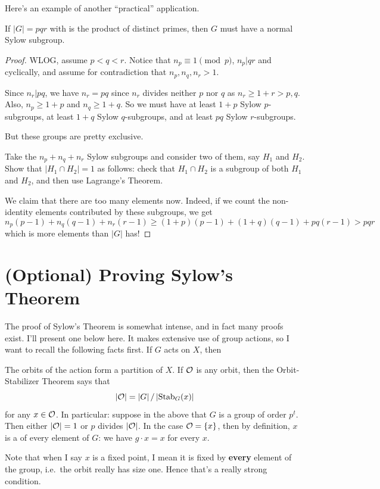 Here's an example of another ``practical'' application.
\begin{proposition}
	If $\left\lvert G \right\rvert = pqr$ with is the product of distinct primes,
	then $G$ must have a normal Sylow subgroup.
\end{proposition}
\begin{proof}
	WLOG, assume $p<q<r$.  Notice that $n_p \equiv 1 \pmod p$, $n_p | qr$ and cyclically, and assume for contradiction that $n_p, n_q, n_r > 1$.
	
	Since $n_r | pq$, we have $n_r = pq$ since $n_r$ divides neither $p$ nor $q$ as $n_r \ge 1 + r > p,q$.  Also, $n_p \ge 1+p$ and $n_q \ge 1+q$.
	So we must have at least $1+p$ Sylow $p$-subgroups,
	at least $1+q$ Sylow $q$-subgroups, and at least $pq$ Sylow $r$-subgroups.

	But these groups are pretty exclusive.
	\begin{ques}
		Take the $n_p+n_q+n_r$ Sylow subgroups and consider two of them, 
		say $H_1$ and $H_2$.
		Show that $\left\lvert H_1 \cap H_2 \right\rvert = 1$
		as follows:
		check that $H_1 \cap H_2$ is a subgroup of both $H_1$ and $H_2$,
		and then use Lagrange's Theorem.
	\end{ques}

	We claim that there are too many elements now.
	Indeed, if we count the non-identity elements contributed by these subgroups, we get
	\[ n_p(p-1) + n_q(q-1) + n_r(r-1)
		\ge (1+p)(p-1) + (1+q)(q-1) + pq(r-1) > pqr 
	\]
	which is more elements than $\left\lvert G \right\rvert$ has!
\end{proof}


\section{(Optional) Proving Sylow's Theorem}
The proof of Sylow's Theorem is somewhat intense, and in fact many proofs exist.
I'll present one below here.
It makes extensive use of group actions, so I want to recall the following facts first.
If $G$ acts on $X$, then
\begin{itemize}
	\ii The orbits of the action form a partition of $X$.
	\ii If $\mathcal O$ is any orbit, then the Orbit-Stabilizer Theorem says that
	\[ \left\lvert \mathcal O \right\rvert = \left\lvert G \right\rvert / \left\lvert \operatorname{Stab}_G(x) \right\rvert \]
	for any $x \in \mathcal O$.
	\ii In particular: suppose in the above that $G$ is a group of order $p^t$.
	Then either $\left\lvert \mathcal O \right\rvert = 1$ or $p$ divides $\left\lvert \mathcal O \right\rvert$.
	In the case $\mathcal O = \{x\}$, then by definition, $x$ is a  of every element of $G$: we have $g \cdot x = x$ for every $x$.
\end{itemize}
Note that when I say $x$ is a fixed point, I mean it is fixed by \textbf{every} element of the group, i.e.\ the orbit really has size one. Hence that's a really strong condition.


